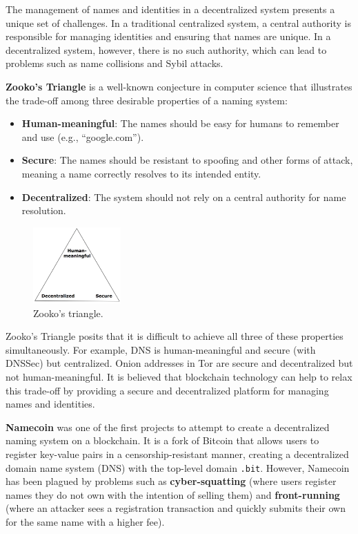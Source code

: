 The management of names and identities in a decentralized system
presents a unique set of challenges. In a traditional centralized
system, a central authority is responsible for managing identities and
ensuring that names are unique. In a decentralized system, however,
there is no such authority, which can lead to problems such as name
collisions and Sybil attacks.

\medskip
\textbf{Zooko's Triangle} is a well-known conjecture in computer science
that illustrates the trade-off among three desirable properties of a
naming system:

\begin{itemize}
	\tightlist
	\item
	\textbf{Human-meaningful}: The names should be easy for humans to
	remember and use (e.g., ``google.com'').
	\item
	\textbf{Secure}: The names should be resistant to spoofing and other
	forms of attack, meaning a name correctly resolves to its intended
	entity.
	\item
	\textbf{Decentralized}: The system should not rely on a central
	authority for name resolution.
\end{itemize}

\begin{figure}[t]
	\begin{center}
		\includegraphics[width=0.3\textwidth]{./figs/zooko.png}
		\caption{Zooko's triangle.}		
		\label{fig:zooko}
	\end{center}	
\end{figure}

Zooko's Triangle posits that it is difficult to achieve all three of
these properties simultaneously. For example, DNS is human-meaningful
and secure (with DNSSec) but centralized. Onion addresses in Tor are
secure and decentralized but not human-meaningful. It is believed that
blockchain technology can help to relax this trade-off by providing a
secure and decentralized platform for managing names and identities.

\textbf{Namecoin} was one of the first projects to attempt to create a
decentralized naming system on a blockchain. It is a fork of Bitcoin
that allows users to register key-value pairs in a censorship-resistant
manner, creating a decentralized domain name system (DNS) with the
top-level domain \texttt{.bit}. However, Namecoin has been plagued by
problems such as \textbf{cyber-squatting} (where users register names
they do not own with the intention of selling them) and
\textbf{front-running} (where an attacker sees a registration
transaction and quickly submits their own for the same name with a
higher fee).

